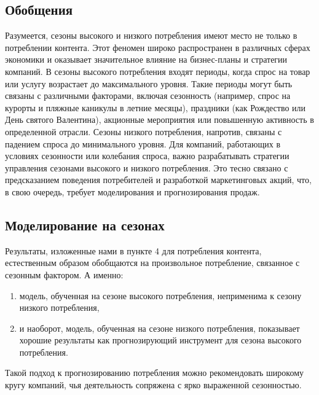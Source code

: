 \documentclass[a4paper,12pt]{article}
\begin{document}
\subsection{Обобщения}
Разумеется, сезоны высокого и низкого потребления имеют место не только в потреблении контента. Этот феномен широко распространен в различных сферах экономики и оказывает значительное влияние на бизнес-планы и стратегии компаний.
В сезоны высокого потребления входят периоды, когда спрос на товар или услугу возрастает до максимального уровня. Такие периоды могут быть связаны с различными факторами, включая сезонность (например, спрос на курорты и пляжные каникулы в летние месяцы), праздники (как Рождество или День святого Валентина), акционные мероприятия или повышенную активность в определенной отрасли. Сезоны низкого потребления, напротив, связаны с падением спроса до минимального уровня. 
Для компаний, работающих в условиях сезонности или колебания спроса, важно разрабатывать стратегии управления сезонами высокого и низкого потребления. Это тесно связано  с предсказанием поведения потребителей и разработкой маркетинговых акций, что, в свою очередь, требует моделирования и прогнозирования продаж.

\subsection{Моделирование на сезонах}
Результаты, изложенные нами в пункте 4 для потребления контента, естественным образом обобщаются на произвольное потребление, связанное с сезонным фактором. А именно: 
\medskip
\begin{enumerate}
	\item модель, обученная на сезоне высокого потребления, неприменима к сезону низкого потребления,
	\item и наоборот, модель, обученная на сезоне низкого потребления, показывает хорошие результаты как прогнозирующий инструмент для сезона высокого потребления.
\end{enumerate}
\medskip
Такой подход к прогнозированию потребления можно рекомендовать широкому кругу компаний, чья деятельность сопряжена с ярко выраженной сезонностью.
\end{document}
